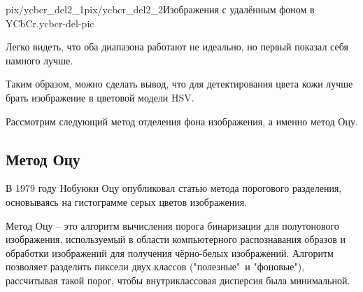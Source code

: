 {pix/ycbcr_del2_1}{pix/ycbcr_del2_2}{Изображения с удалённым
фоном в YCbCr.}{ycbcr-del-pic}

Легко видеть, что оба диапазона работают не идеально, но первый 
показал себя намного лучше. 

Таким образом, можно сделать вывод, что для детектирования цвета кожи 
лучше брать изображение в цветовой модели HSV. 

Рассмотрим следующий метод отделения фона изображения, а именно метод
Оцу.

\subsection{Метод Оцу}

В 1979 году Нобуюки Оцу опубликовал статью \cite{otsu} метода порогового 
разделения, основываясь на гистограмме серых цветов изображения. 

Метод Оцу -- это алгоритм вычисления порога бинаризации для полутонового
изображения, используемый в области компьютерного распознавания образов
и обработки изображений для получения чёрно-белых изображений. Алгоритм
позволяет разделить пиксели двух классов ("полезные"\ и "фоновые"), 
рассчитывая такой порог, чтобы внутриклассовая дисперсия была
минимальной.

